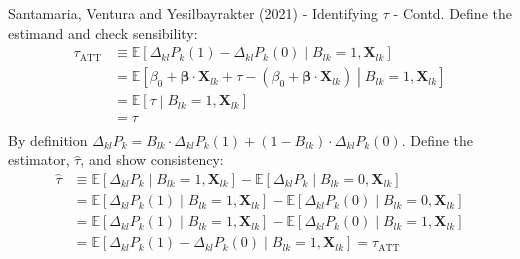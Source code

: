 \documentclass[aspectratio=169,10pt,hyperref={colorlinks,linkcolor={red!50!black},citecolor={blue!90!black},urlcolor={blue!80!black}},usenames,dvipsnames]{beamer}
\begin{document}
\begin{frame}{Santamaria, Ventura and Yesilbayrakter (2021) - Identifying $\tau$ - Contd.}
  Define the estimand and check sensibility: \vspace{-10pt}
  \begin{equation*}
    \begin{aligned}
      \tau_{\text{ATT}} 
        &\equiv \mathbb{E}\left[\Delta_{kl}P_{k}(1) - \Delta_{kl}P_{k}(0)\middle \vert B_{lk} = 1,\boldsymbol{X}_{lk} \right] \\
        &= \mathbb{E}\left[\beta_0 + \boldsymbol{\beta}\cdot \boldsymbol{X}_{lk} + \tau
                          - \left(\beta_0 + \boldsymbol{\beta}\cdot \boldsymbol{X}_{lk}\right)\middle \vert B_{lk} = 1,\boldsymbol{X}_{lk} \right] \\
        &= \mathbb{E}\left[\tau \middle \vert B_{lk} = 1,\boldsymbol{X}_{lk} \right] \\
        &= \tau \\[-10pt]
    \end{aligned}
  \end{equation*}
  By definition $\Delta_{kl}P_{k} = B_{lk}\cdot\Delta_{kl}P_{k}(1) + \left(1-B_{lk}\right)\cdot\Delta_{kl}P_{k}(0)$. Define the estimator, $\hat{\tau}$, and show consistency: \vspace{-10pt}
  \begin{equation*}
    \begin{aligned}
      \hat{\tau} 
        &\equiv \mathbb{E}\left[\Delta_{kl}P_{k}\middle \vert B_{lk} = 1,\boldsymbol{X}_{lk} \right] 
            - \mathbb{E}\left[\Delta_{kl}P_{k}\middle \vert B_{lk} = 0,\boldsymbol{X}_{lk} \right] \\
        &= \mathbb{E}\left[\Delta_{kl}P_{k}(1)\middle \vert B_{lk} = 1,\boldsymbol{X}_{lk} \right] 
            - \mathbb{E}\left[\Delta_{kl}P_{k}(0)\middle \vert B_{lk} = 0,\boldsymbol{X}_{lk} \right] \\
            &= \mathbb{E}\left[\Delta_{kl}P_{k}(1)\middle \vert B_{lk} = 1,\boldsymbol{X}_{lk} \right] 
            - \mathbb{E}\left[\Delta_{kl}P_{k}(0)\middle \vert B_{lk} = 1,\boldsymbol{X}_{lk} \right] \\
        &= \mathbb{E}\left[\Delta_{kl}P_{k}(1)-\Delta_{kl}P_{k}(0)\middle \vert B_{lk} = 1,\boldsymbol{X}_{lk} \right] = \tau_{\text{ATT}} 
        \\[-10pt]
    \end{aligned}
  \end{equation*}
\end{frame}
\end{document}
